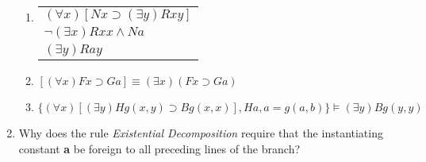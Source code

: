\documentclass[12pt,letterpaper]{article}
\begin{document}
\begin{enumerate}
\begin{enumerate}
        \item
          \begin{tabular}{l}
            $(\forall x)[Nx \supset (\exists y)Rxy]$ \\
            $\neg (\exists x)Rxx \land Na$ \\
            \hline
            $(\exists y)Ray$
          \end{tabular}
        \item $[(\forall x)Fx \supset Ga] \equiv (\exists x)(Fx \supset Ga)$
        \item $\{(\forall x)[(\exists y) Hg(x,y) \supset Bg(x,x)], Ha, a = g(a,b)\} \vDash (\exists y)Bg(y,y)$
      \end{enumerate}
    \item
      Why does the rule \textit{Existential Decomposition}
      require that the instantiating constant \textbf{a}
      be foreign to all preceding lines of the branch?
  \end{enumerate}
\end{document}
